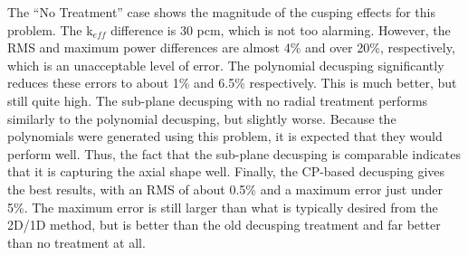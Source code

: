 \begin{table}[h]
\centering
\caption{VERA Problem 4 Decusping Results}\label{t:p4decusp}
\end{table}

The ``No Treatment'' case shows the magnitude of the cusping effects for this problem.  The k$_{eff}$ difference is 30 pcm, which is not too alarming.  However, the RMS and maximum power differences are almost 4\% and over 20\%, respectively, which is an unacceptable level of error.  The polynomial decusping significantly reduces these errors to about 1\% and 6.5\% respectively.  This is much better, but still quite high.  The sub-plane decusping with no radial treatment performs similarly to the polynomial decusping, but slightly worse.  Because the polynomials were generated using this problem, it is expected that they would perform well.  Thus, the fact that the sub-plane decusping is comparable indicates that it is capturing the axial shape well.  Finally, the CP-based decusping gives the best results, with an RMS of about 0.5\% and a maximum error just under 5\%.  The maximum error is still larger than what is typically desired from the 2D/1D method, but is better than the old decusping treatment and far better than no treatment at all.

